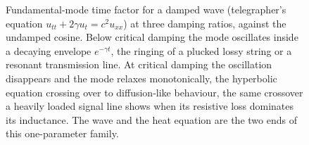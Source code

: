 \begin{figure}[htbp]
\centering
{}
\caption[Damped-wave mode decay]{Fundamental-mode time factor for a
damped wave (telegrapher's equation $u_{tt} + 2\gamma u_t = c^2
u_{xx}$) at three damping ratios, against the undamped cosine. Below
critical damping the mode oscillates inside a decaying envelope
$e^{-\gamma t}$, the ringing of a plucked lossy string or a
resonant transmission line. At critical damping the oscillation
disappears and the mode relaxes monotonically, the hyperbolic
equation crossing over to diffusion-like behaviour, the same
crossover a heavily loaded signal line shows when its resistive loss
dominates its inductance. The wave and the heat equation are the two
ends of this one-parameter family.}
\label{fig:vol02:ch12:damped-wave}
\end{figure}
